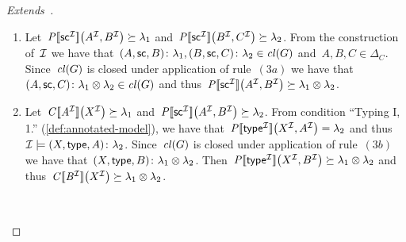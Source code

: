 \begin{proof}[Extends~\citep{MunozPerezGutierrez:2009aa}]
\begin{description}[nosep]
\begin{enumerate}[label=(\alph*),nosep]
    \item Let~$\mathit{{P[\![{\mathsf{sc}}^{\mathcal{I}}]\!]}}\!\left({A}^{\mathcal{I}}, {B}^{\mathcal{I}}\right) \succeq \lambda_{1}$
      and~$\mathit{{P[\![{\mathsf{sc}}^{\mathcal{I}}]\!]}}\!\left({B}^{\mathcal{I}}, {C}^{\mathcal{I}}\right) \succeq \lambda_{2}$.
      From the construction of~$\mathcal{I}$ we have that~$\mbox{$(A,\mathsf{sc},B)\colon\lambda_{1}$},
      \mbox{$(B,\mathsf{sc},C)\colon\lambda_{2}$} \in \mathit{cl}\!\left(G\right)$ and~$A,B,C \in \Delta_C$.  Since~$\mathit{cl}\!\left(G\right)$ is
      closed under application of rule~$(3a)$ we have that~$\mbox{$(A,\mathsf{sc},C)\colon\lambda_{1} \otimes
        \lambda_{2}$} \in \mathit{cl}\!\left(G\right)$ and thus~$\mathit{{P[\![{\mathsf{sc}}^{\mathcal{I}}]\!]}}\!\left({A}^{\mathcal{I}}, {B}^{\mathcal{I}}\right) \succeq \lambda_{1} \otimes
      \lambda_{2}$.

    \item Let~$\mathit{{C[\![{A}^{\mathcal{I}}]\!]}}\!\left({X}^{\mathcal{I}}\right) \succeq \lambda_{1}$ and~$\mathit{{P[\![{\mathsf{sc}}^{\mathcal{I}}]\!]}}\!\left({A}^{\mathcal{I}}, {B}^{\mathcal{I}}\right)
      \succeq \lambda_{2}$.
      From condition ``Typing I, 1.'' (\cref{def:annotated-model}), we have that~$\mathit{{P[\![{\mathsf{type}}^{\mathcal{I}}]\!]}}\!\left({X}^{\mathcal{I}},
        {A}^{\mathcal{I}}\right) = \lambda_{2}$ and thus~$\mathcal{I} \models \mbox{$(X, \mathsf{type}, A)\colon\lambda_{2}$}$.
      Since~$\mathit{cl}\!\left(G\right)$ is closed under application of rule~$(3b)$ we have that~$\mbox{$(X, \mathsf{type}, B)\colon\lambda_1
        \otimes \lambda_2$}$.
      Then~$\mathit{{P[\![{\mathsf{type}}^{\mathcal{I}}]\!]}}\!\left({X}^{\mathcal{I}}, {B}^{\mathcal{I}}\right) \succeq \lambda_{1} \otimes \lambda_{2}$ and
      thus~$\mathit{{C[\![{B}^{\mathcal{I}}]\!]}}\!\left({X}^{\mathcal{I}}\right) \succeq \lambda_{1} \otimes \lambda_{2}$.
    \end{enumerate}
  \item[Typing I:]~
\end{description}
\end{proof}
